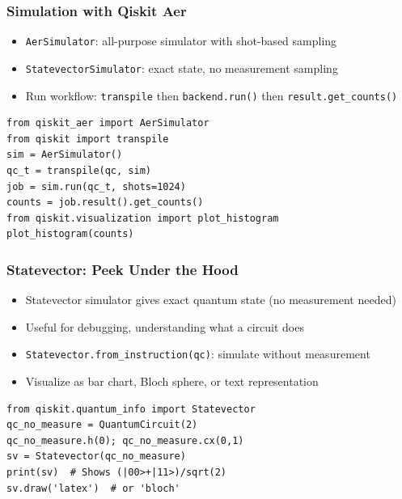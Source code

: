 \begin{frame}[fragile]\frametitle{Simulation with Qiskit Aer}
\begin{itemize}
\item \texttt{AerSimulator}: all-purpose simulator with shot-based sampling
\item \texttt{StatevectorSimulator}: exact state, no measurement sampling
\item Run workflow: \texttt{transpile} then \texttt{backend.run()} then \texttt{result.get\_counts()}
\end{itemize}
\begin{verbatim}
from qiskit_aer import AerSimulator
from qiskit import transpile
sim = AerSimulator()
qc_t = transpile(qc, sim)
job = sim.run(qc_t, shots=1024)
counts = job.result().get_counts()
from qiskit.visualization import plot_histogram
plot_histogram(counts)
\end{verbatim}
\end{frame}

\begin{frame}[fragile]\frametitle{Statevector: Peek Under the Hood}
\begin{itemize}
\item Statevector simulator gives exact quantum state (no measurement needed)
\item Useful for debugging, understanding what a circuit does
\item \texttt{Statevector.from\_instruction(qc)}: simulate without measurement
\item Visualize as bar chart, Bloch sphere, or text representation
\end{itemize}
\begin{verbatim}
from qiskit.quantum_info import Statevector
qc_no_measure = QuantumCircuit(2)
qc_no_measure.h(0); qc_no_measure.cx(0,1)
sv = Statevector(qc_no_measure)
print(sv)  # Shows (|00>+|11>)/sqrt(2)
sv.draw('latex')  # or 'bloch'
\end{verbatim}
\end{frame}

